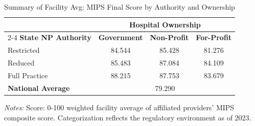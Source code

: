 \begin{table}[htbp]
    \centering
    \caption{Summary of Facility Avg: MIPS Final Score by Authority and Ownership}
    \label{tab:mips_final_score_own}
    \vspace{0.2cm}
    \begin{tabular}{lccc}
        \toprule
        & \multicolumn{3}{c}{\textbf{Hospital Ownership}} \\
        \cmidrule(lr){2-4}
        \textbf{State NP Authority} & \textbf{Government} & \textbf{Non-Profit} & \textbf{For-Profit} \\
        \midrule
        Restricted & 84.544 & 85.428 & 81.276 \\
        Reduced & 85.483 & 87.084 & 84.109 \\
        Full Practice & 88.215 & 87.753 & 83.679 \\
        \midrule
        \textbf{National Average} & \multicolumn{3}{c}{79.290} \\
        \bottomrule
    \end{tabular}
    \vspace{0.1cm}
    \begin{minipage}{0.85\textwidth}
        \footnotesize \textit{Notes:} Score: 0-100 weighted facility average of affiliated providers' MIPS composite score. Categorization reflects the regulatory environment as of 2023.
    \end{minipage}
\end{table}